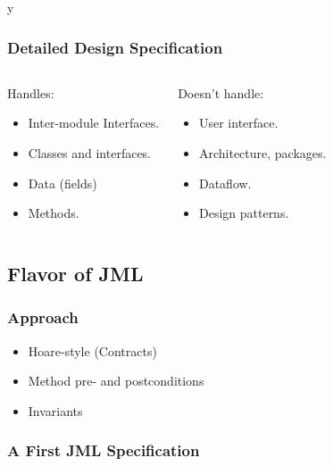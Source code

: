 \if y\MAKEHANDOUTS \documentclass[compress,landscape,handout]{beamer}
\begin{document}
\begin{frame}
\frametitle{Detailed Design Specification}

\begin{columns}[t]
\begin{block}{Handles:}
\begin{itemize}
\item
Inter-module Interfaces.

\item
Classes and interfaces.

\item 
Data (fields)

\item
Methods.
\end{itemize}
\end{block}

\pause

\begin{block}{Doesn't handle:}
\begin{itemize}
\item
User interface.

\item 
Architecture, packages.

\item
Dataflow.

\item
Design patterns.
\end{itemize}
\end{block}
\end{columns}
\end{frame}

\subsection[Flavor]{Flavor of JML}

\begin{frame}
\frametitle{Approach}
\begin{itemize}
\item
Hoare-style (Contracts)

\item
Method pre- and postconditions 

\item
Invariants
\end{itemize}
\end{frame}

\begin{frame}[fragile]
\frametitle{A First JML Specification}

\end{frame}
\end{document}
